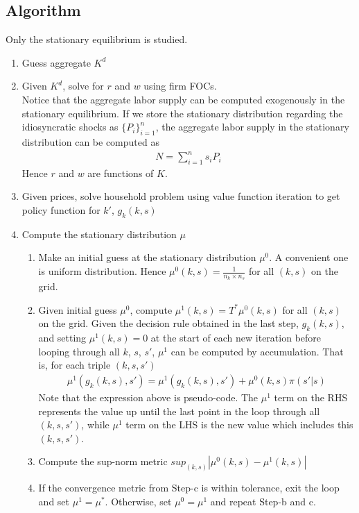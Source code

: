 \documentclass{article}
\begin{document}
\begin{spacing}{1.5}
\section{Algorithm}
\setlength{\parindent}{2em}
Only the stationary equilibrium is studied.
\begin{enumerate}
\item Guess aggregate $K^d$
\item Given $K^d$, solve for $r$ and $w$ using firm FOCs. \\
Notice that the aggregate labor supply can be computed exogenously in the stationary equilibrium. If we store the stationary distribution regarding the idiosyncratic shocks as $\{P_i\}_{i=1}^{n}$, the aggregate labor supply in the stationary distribution can be computed as
\begin{align*}
N=\sum_{i=1}^ns_iP_i
\end{align*}
Hence $r$ and $w$ are functions of $K$.
\item Given prices, solve household problem using value function iteration to get policy function for $k'$, $g_k(k,s)$
\item Compute the stationary distribution $\mu$
\begin{enumerate}
\item Make an initial guess at the stationary distribution $\mu^0$. A convenient one is uniform distribution. Hence $\mu^0(k,s)=\frac{1}{n_k\times n_s}$ for all $(k,s)$ on the grid.
\item Given initial guess $\mu^0$, compute $\mu^1(k,s)=T^*\mu^0(k,s)$ for all $(k,s)$ on the grid. Given the decision rule obtained in the last step, $g_k(k,s)$, and setting $\mu^1(k,s)=0$ at the start of each new iteration before looping through all $k$, $s$, $s'$, $\mu^1$ can be computed by accumulation. That is, for each triple $(k,s,s')$
\begin{align*}
\mu^1(g_k(k,s),s')=\mu^1(g_k(k,s),s')+\mu^0(k,s)\pi(s'|s)
\end{align*}
Note that the expression above is pseudo-code. The $\mu^1$ term on the RHS represents the value up until the last point in the loop through all $(k,s,s')$, while $\mu^1$ term on the LHS is the new value which includes this $(k,s,s')$.
\item Compute the sup-norm metric $sup_{(k,s)}|\mu^0(k,s)-\mu^1(k,s)|$
\item If the convergence metric from Step-c is within tolerance, exit the loop and set $\mu^1=\mu^*$. Otherwise, set $\mu^0=\mu^1$ and repeat Step-b and c.
\end{enumerate}

\end{enumerate}
\end{spacing}
\end{document}
